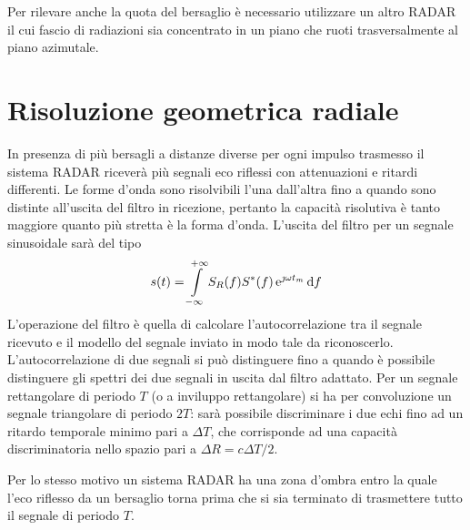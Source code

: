 Per rilevare anche la quota del bersaglio è necessario utilizzare un altro \ac{RADAR} il cui fascio di radiazioni sia concentrato in un piano che ruoti trasversalmente al piano azimutale.

\clearpage
\section{Risoluzione geometrica radiale}
In presenza di più bersagli a distanze diverse per ogni impulso trasmesso il sistema \ac{RADAR} riceverà più segnali eco riflessi con attenuazioni e ritardi differenti. Le forme d'onda sono risolvibili l'una dall'altra fino a quando sono distinte all'uscita del filtro in ricezione, pertanto la capacità risolutiva è tanto maggiore quanto più stretta è la forma d'onda. L'uscita del filtro per un segnale sinusoidale sarà del tipo
\begin{equation}
s(t)=\int\limits_{-\infty}^{+\infty}{S_R(f){S}^\ast(f)\operatorname{e}^{\jmath\omega t_m}}{\,\mathop{}\!\mathrm{d}{f}}
\end{equation}
L'operazione del filtro è quella di calcolare l'autocorrelazione tra il segnale ricevuto e il modello del segnale inviato in modo tale da riconoscerlo. L'autocorrelazione di due segnali si può distinguere fino a quando è possibile distinguere gli spettri dei due segnali in uscita dal filtro adattato. Per un segnale rettangolare di periodo $T$ (o a inviluppo rettangolare) si ha per convoluzione un segnale triangolare di periodo $2T$: sarà possibile discriminare i due echi fino ad un ritardo temporale minimo pari a $\Delta T$, che corrisponde ad una capacità discriminatoria nello spazio pari a $\Delta R=c \Delta T/2$.

Per lo stesso motivo un sistema \ac{RADAR} ha una zona d'ombra entro la quale l'eco riflesso da un bersaglio torna prima che si sia terminato di trasmettere tutto il segnale di periodo $T$.

